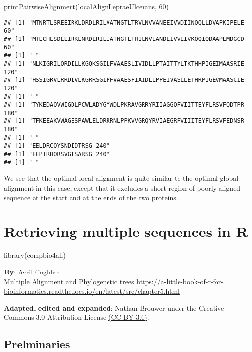 \documentclass[
]{book}
\newenvironment{Shaded}{\begin{snugshade}}{\end{snugshade}}
\newcommand{\DecValTok}[1]{\textcolor[rgb]{0.00,0.00,0.81}{#1}}
\newcommand{\FunctionTok}[1]{\textcolor[rgb]{0.00,0.00,0.00}{#1}}
\newcommand{\NormalTok}[1]{#1}
\begin{document}
\begin{Shaded}
\begin{Highlighting}[]
\FunctionTok{printPairwiseAlignment}\NormalTok{(localAlignLepraeUlcerans, }\DecValTok{60}\NormalTok{)}
\end{Highlighting}
\end{Shaded}

\begin{verbatim}
## [1] "MTNRTLSREEIRKLDRDLRILVATNGTLTRVLNVVANEEIVVDIINQQLLDVAPKIPELE 60"
## [1] "MTECHLSDEEIRKLNRDLRILIATNGTLTRILNVLANDEIVVEIVKQQIQDAAPEMDGCD 60"
## [1] " "
## [1] "NLKIGRILQRDILLKGQKSGILFVAAESLIVIDLLPTAITTYLTKTHHPIGEIMAASRIE 120"
## [1] "HSSIGRVLRRDIVLKGRRSGIPFVAAESFIAIDLLPPEIVASLLETHRPIGEVMAASCIE 120"
## [1] " "
## [1] "TYKEDAQVWIGDLPCWLADYGYWDLPKRAVGRRYRIIAGGQPVIITTEYFLRSVFQDTPR 180"
## [1] "TFKEEAKVWAGESPAWLELDRRRNLPPKVVGRQYRVIAEGRPVIIITEYFLRSVFEDNSR 180"
## [1] " "
## [1] "EELDRCQYSNDIDTRSG 240"
## [1] "EEPIRHQRSVGTSARSG 240"
## [1] " "
\end{verbatim}

We see that the optimal local alignment is quite similar to the optimal global alignment in this case, except that it excludes a short region of poorly aligned sequence at the start and at the ends of the two proteins.

\hypertarget{retrieving-multiple-sequences-in-r}{%
\chapter{Retrieving multiple sequences in R}\label{retrieving-multiple-sequences-in-r}}

\begin{Shaded}
\begin{Highlighting}[]
\FunctionTok{library}\NormalTok{(compbio4all)}
\end{Highlighting}
\end{Shaded}

\textbf{By}: Avril Coghlan.\\
Multiple Alignment and Phylogenetic trees
\url{https://a-little-book-of-r-for-bioinformatics.readthedocs.io/en/latest/src/chapter5.html}

\textbf{Adapted, edited and expanded}: Nathan Brouwer under the Creative Commons 3.0 Attribution License \href{https://creativecommons.org/licenses/by/3.0/}{(CC BY 3.0)}.

\hypertarget{prelminaries}{%
\section{Prelminaries}\label{prelminaries}}
\end{document}
